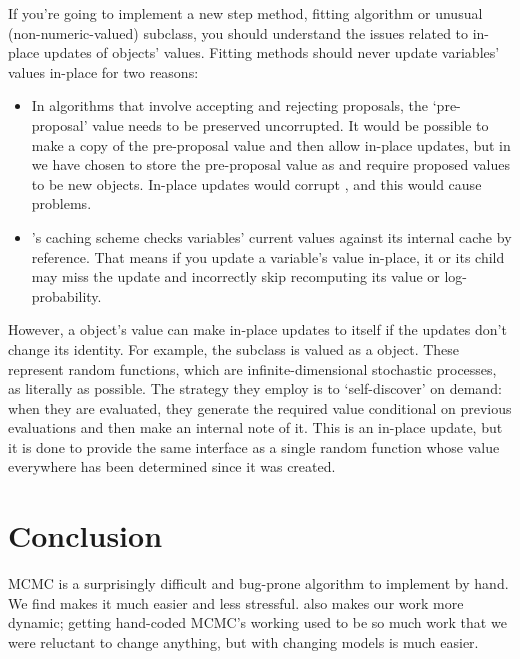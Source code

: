 \documentclass[]{jss}
\begin{document}
If you're going to implement a new step method, fitting algorithm or unusual (non-numeric-valued)  subclass, you should understand the issues related to in-place updates of  objects' values. Fitting methods should never update variables' values in-place for two reasons:
\begin{itemize}
   \item In algorithms that involve accepting and rejecting proposals, the `pre-proposal' value needs to be preserved uncorrupted. It would be possible to make a copy of the pre-proposal value and then allow in-place updates, but in  we have chosen to store the pre-proposal value as  and require proposed values to be new objects. In-place updates would corrupt , and this would cause problems.
   \item {}'s caching scheme checks variables' current values against its internal cache by reference. That means if you update a variable's value in-place, it or its child may miss the update and incorrectly skip recomputing its value or log-probability.
\end{itemize}

However, a  object's value can make in-place updates to itself if the updates don't change its identity. For example, the  subclass  is valued as a  object. These represent random functions, which are infinite-dimensional stochastic processes, as literally as possible. The strategy they employ is to `self-discover' on demand: when they are evaluated, they generate the required value conditional on previous evaluations and then make an internal note of it. This is an in-place update, but it is done to provide the same interface as a single random function whose value everywhere has been determined since it was created.


\clearpage

\section{Conclusion}
\label{conclusion}

MCMC is a surprisingly difficult and bug-prone algorithm to implement by hand. We find  makes it much easier and less stressful.  also makes our work more dynamic; getting hand-coded MCMC's working used to be so much work that we were reluctant to change anything, but with  changing models is much easier. 
\end{document}
